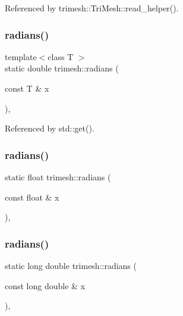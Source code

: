 Referenced by trimesh\+::\+Tri\+Mesh\+::read\+\_\+helper().

\mbox{\label{namespacetrimesh_ab544311a1caac19fcd9de0556782dac5}} 
\subsubsection{\texorpdfstring{radians()}{radians()}\hspace{0.1cm}{\footnotesize\ttfamily [1/3]}}
{\footnotesize\ttfamily template$<$class T $>$ \\
static double trimesh\+::radians (\begin{DoxyParamCaption}\item[{const T \&}]{x }\end{DoxyParamCaption})\hspace{0.3cm}{\ttfamily [inline]}, {\ttfamily [static]}}



Referenced by std\+::get().

\mbox{\label{namespacetrimesh_a7d0700b74406bdf2c1d89a761ab9976d}} 
\subsubsection{\texorpdfstring{radians()}{radians()}\hspace{0.1cm}{\footnotesize\ttfamily [2/3]}}
{\footnotesize\ttfamily static float trimesh\+::radians (\begin{DoxyParamCaption}\item[{const float \&}]{x }\end{DoxyParamCaption})\hspace{0.3cm}{\ttfamily [inline]}, {\ttfamily [static]}}

\mbox{\label{namespacetrimesh_ab5bdc2d41abb1c4a85aedf902c33a239}} 
\subsubsection{\texorpdfstring{radians()}{radians()}\hspace{0.1cm}{\footnotesize\ttfamily [3/3]}}
{\footnotesize\ttfamily static long double trimesh\+::radians (\begin{DoxyParamCaption}\item[{const long double \&}]{x }\end{DoxyParamCaption})\hspace{0.3cm}{\ttfamily [inline]}, {\ttfamily [static]}}

